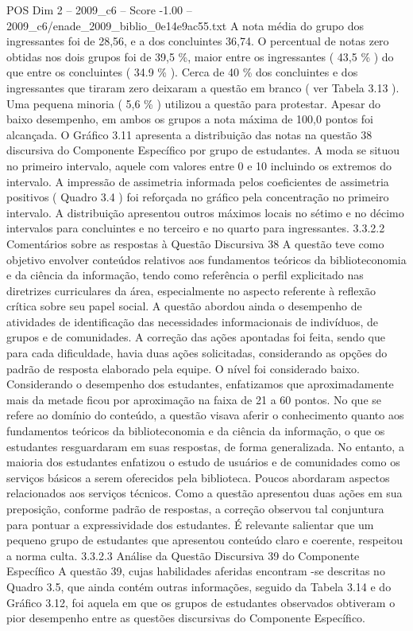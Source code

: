 \begin{textsample}{POS Dim 2 – 2009\_c6 – Score -1.00 – 2009\_c6/enade\_2009\_biblio\_0e14e9ac55.txt}
A nota média do grupo dos ingressantes foi de 28,56, e a dos concluintes 36,74.
O percentual de notas zero obtidas nos dois grupos foi de 39,5 \%, maior entre os ingressantes ( 43,5 \% ) do que entre os concluintes ( 34.9 \% ).
Cerca de 40 \% dos concluintes e dos ingressantes que tiraram zero deixaram a questão em branco ( ver Tabela 3.13 ).
Uma pequena minoria ( 5,6 \% ) utilizou a questão para protestar.
Apesar do baixo desempenho, em ambos os grupos a nota máxima de 100,0 pontos foi alcançada.
O Gráfico 3.11 apresenta a distribuição das notas na questão 38 discursiva do Componente Específico por grupo de estudantes.
A moda se situou no primeiro intervalo, aquele com valores entre 0 e 10 incluindo os extremos do intervalo.
A impressão de assimetria informada pelos coeficientes de assimetria positivos ( Quadro 3.4 ) foi reforçada no gráfico pela concentração no primeiro intervalo.
A distribuição apresentou outros máximos locais no sétimo e no décimo intervalos para concluintes e no terceiro e no quarto para ingressantes. 3.3.2.2 Comentários sobre as respostas à Questão Discursiva 38 A questão teve como objetivo envolver conteúdos relativos aos fundamentos teóricos da biblioteconomia e da ciência da informação, tendo como referência o perfil explicitado nas diretrizes curriculares da área, especialmente no aspecto referente à reflexão crítica sobre seu papel social.
A questão abordou ainda o desempenho de atividades de identificação das necessidades informacionais de indivíduos, de grupos e de comunidades.
A correção das ações apontadas foi feita, sendo que para cada dificuldade, havia duas ações solicitadas, considerando as opções do padrão de resposta elaborado pela equipe.
O nível foi considerado baixo.
Considerando o desempenho dos estudantes, enfatizamos que aproximadamente mais da metade ficou por aproximação na faixa de 21 a 60 pontos.
No que se refere ao domínio do conteúdo, a questão visava aferir o conhecimento quanto aos fundamentos teóricos da biblioteconomia e da ciência da informação, o que os estudantes resguardaram em suas respostas, de forma generalizada.
No entanto, a maioria dos estudantes enfatizou o estudo de usuários e de comunidades como os serviços básicos a serem oferecidos pela biblioteca.
Poucos abordaram aspectos relacionados aos serviços técnicos.
Como a questão apresentou duas ações em sua preposição, conforme padrão de respostas, a correção observou tal conjuntura para pontuar a expressividade dos estudantes.
É relevante salientar que um pequeno grupo de estudantes que apresentou conteúdo claro e coerente, respeitou a norma culta. 3.3.2.3 Análise da Questão Discursiva 39 do Componente Específico A questão 39, cujas habilidades aferidas encontram -se descritas no Quadro 3.5, que ainda contém outras informações, seguido da Tabela 3.14 e do Gráfico 3.12, foi aquela em que os grupos de estudantes observados obtiveram o pior desempenho entre as questões discursivas do Componente Específico.

\end{textsample}

